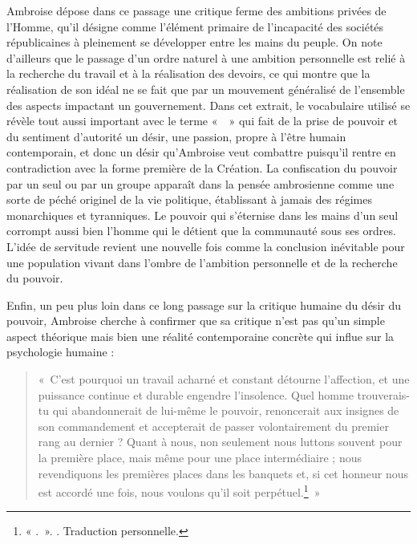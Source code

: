 Ambroise dépose dans ce passage une critique ferme des ambitions privées de l'Homme, qu'il désigne comme l'élément primaire de l'incapacité des sociétés républicaines à pleinement se développer entre les mains du peuple. On note d'ailleurs que le passage d'un ordre naturel à une ambition personnelle est relié à la recherche du travail et à la réalisation des devoirs, ce qui montre que la réalisation de son idéal ne se fait que par un mouvement généralisé de l'ensemble des aspects impactant un gouvernement. Dans cet extrait, le vocabulaire utilisé se révèle tout aussi important avec le terme «~~» qui fait de la prise de pouvoir et du sentiment d'autorité un désir, une passion, propre à l'être humain contemporain, et donc un désir qu'Ambroise veut combattre puisqu'il rentre en contradiction avec la forme première de la Création. La confiscation du pouvoir par un seul ou par un groupe apparaît dans la pensée ambrosienne comme une sorte de péché originel de la vie politique, établissant à jamais des régimes monarchiques et tyranniques. Le pouvoir qui s'éternise dans les mains d'un seul corrompt aussi bien l'homme qui le détient que la communauté sous ses ordres. L'idée de servitude revient une nouvelle fois comme la conclusion inévitable pour une population vivant dans l'ombre de l'ambition personnelle et de la recherche du pouvoir.

\bigskip

Enfin, un peu plus loin dans ce long passage sur la critique humaine du désir du pouvoir, Ambroise cherche à confirmer que sa critique n'est pas qu'un simple aspect théorique mais bien une réalité contemporaine concrète qui influe sur la psychologie humaine :

\bigskip

\begin{quote}
    «~C’est pourquoi un travail acharné et constant détourne l'affection, et une puissance continue et durable engendre l'insolence. Quel homme trouverais-tu qui abandonnerait de lui-même le pouvoir, renoncerait aux insignes de son commandement et accepterait de passer volontairement du premier rang au dernier ? Quant à nous, non seulement nous luttons souvent pour la première place, mais même pour une place intermédiaire ; nous revendiquons les premières places dans les banquets et, si cet honneur nous est accordé une fois, nous voulons qu'il soit perpétuel.\footnote{« .~». \cite[\nopp V, 15, 52]{ambroise_csel_32_1}. Traduction personnelle.}~»
\end{quote}

